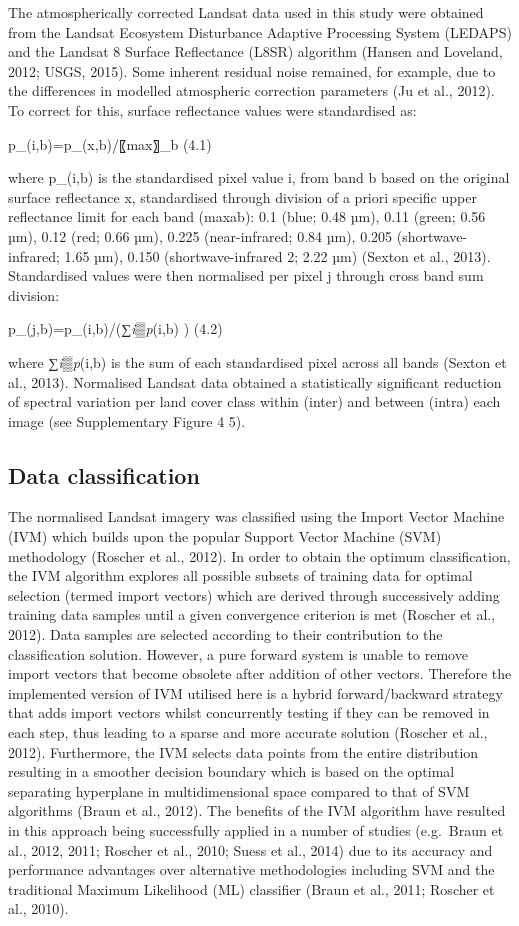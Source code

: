 \documentclass[]{book}
\begin{document}
The atmospherically corrected Landsat data used in this study were
obtained from the Landsat Ecosystem Disturbance Adaptive Processing
System (LEDAPS) and the Landsat 8 Surface Reflectance (L8SR) algorithm
(Hansen and Loveland, 2012; USGS, 2015). Some inherent residual noise
remained, for example, due to the differences in modelled atmospheric
correction parameters (Ju et al., 2012). To correct for this, surface
reflectance values were standardised as:

p\_(i,b)=p\_(x,b)/〖max〗\_b (4.1)

where p\_(i,b) is the standardised pixel value i, from band b based on
the original surface reflectance x, standardised through division of a
priori specific upper reflectance limit for each band (maxab): 0.1
(blue; 0.48 µm), 0.11 (green; 0.56 µm), 0.12 (red; 0.66 µm), 0.225
(near-infrared; 0.84 µm), 0.205 (shortwave-infrared; 1.65 µm), 0.150
(shortwave-infrared 2; 2.22 µm) (Sexton et al., 2013). Standardised
values were then normalised per pixel j through cross band sum division:

p\_(j,b)=p\_(i,b)/(∑\emph{i▒p}(i,b) ) (4.2)

where ∑\emph{i▒p}(i,b) is the sum of each standardised pixel across all
bands (Sexton et al., 2013). Normalised Landsat data obtained a
statistically significant reduction of spectral variation per land cover
class within (inter) and between (intra) each image (see Supplementary
Figure 4 5).

\subsection{Data classification}\label{data-classification}

The normalised Landsat imagery was classified using the Import Vector
Machine (IVM) which builds upon the popular Support Vector Machine (SVM)
methodology (Roscher et al., 2012). In order to obtain the optimum
classification, the IVM algorithm explores all possible subsets of
training data for optimal selection (termed import vectors) which are
derived through successively adding training data samples until a given
convergence criterion is met (Roscher et al., 2012). Data samples are
selected according to their contribution to the classification solution.
However, a pure forward system is unable to remove import vectors that
become obsolete after addition of other vectors. Therefore the
implemented version of IVM utilised here is a hybrid forward/backward
strategy that adds import vectors whilst concurrently testing if they
can be removed in each step, thus leading to a sparse and more accurate
solution (Roscher et al., 2012). Furthermore, the IVM selects data
points from the entire distribution resulting in a smoother decision
boundary which is based on the optimal separating hyperplane in
multidimensional space compared to that of SVM algorithms (Braun et al.,
2012). The benefits of the IVM algorithm have resulted in this approach
being successfully applied in a number of studies (e.g.~Braun et al.,
2012, 2011; Roscher et al., 2010; Suess et al., 2014) due to its
accuracy and performance advantages over alternative methodologies
including SVM and the traditional Maximum Likelihood (ML) classifier
(Braun et al., 2011; Roscher et al., 2010).
\end{document}
